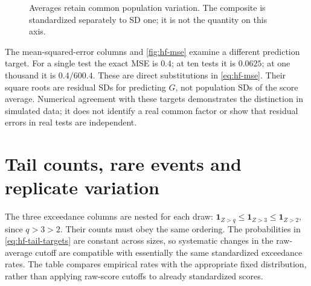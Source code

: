 \begin{figure}[htbp]
\centering
{}
\caption{Averages retain common population variation. The composite is
standardized separately to SD one; it is not the quantity on this axis.}
\label{fig:hf-sd}
\end{figure}

The mean-squared-error columns and \cref{fig:hf-mse} examine a different prediction target.
For a single test the exact MSE is \(0.4\); at ten tests it is
\(0.0625\); at one thousand it is \(0.4/600.4\). These are direct
substitutions in \eqref{eq:hf-mse}. Their square roots are residual SDs
for predicting \(G\), not population SDs of the score average. Numerical
agreement with these targets demonstrates the distinction in simulated
data; it does not identify a real common factor or show that residual
errors in real tests are independent.

\chapter{Tail counts, rare events and replicate variation}
\begingroup\small

\endgroup
\begingroup
\let\subsection\section

\endgroup
The three exceedance columns are nested for each draw:
\(\mathbf1_{Z>q}\leq\mathbf1_{Z>3}\leq\mathbf1_{Z>2}\), since
\(q>3>2\). Their counts must obey the same ordering. The probabilities
in \eqref{eq:hf-tail-targets} are constant across sizes, so systematic
changes in the raw-average cutoff are compatible with essentially the
same standardized exceedance rates. The table compares empirical rates
with the appropriate fixed distribution, rather than applying raw-score
cutoffs to already standardized scores.


